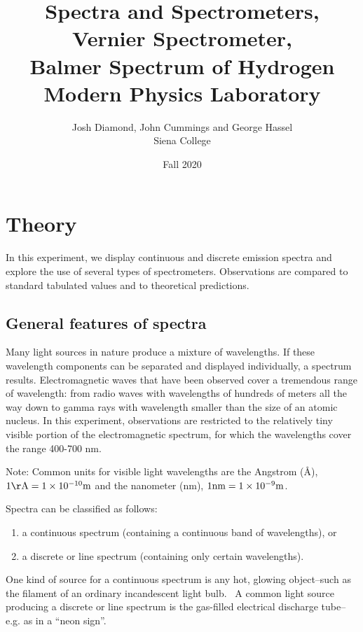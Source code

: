 \documentclass{article}
\begin{document}
\title{Spectra and Spectrometers,\\ Vernier Spectrometer,\\ Balmer Spectrum of Hydrogen\\
Modern Physics Laboratory}
\author{Josh Diamond, John Cummings and George Hassel\\
Siena College}
\date{Fall 2020}
\maketitle

\section{Theory}
In this experiment, we display continuous and discrete emission spectra
and explore the use of several types of spectrometers.  Observations
are compared to standard tabulated values and to theoretical
predictions.


\subsection{General features of spectra}
Many light sources in nature produce a mixture of wavelengths.  If
these wavelength components can be separated and displayed
individually, a spectrum results.  Electromagnetic waves that have
been observed cover a tremendous range of wavelength: from radio waves
with wavelengths of hundreds of meters all the way down to gamma rays
with wavelength smaller than the size of an atomic nucleus. In this
experiment, observations are restricted to the relatively tiny visible
portion of the electromagnetic spectrum, for which the wavelengths
cover the range 400-700 nm.

Note:  Common units for visible light wavelengths are the Angstrom
({\AA}), $1 {\rm \AA} = 1 \times 10^{-10} {\rm m}$ and the nanometer (nm), $1 {\rm nm} = 1 \times 10^{-9} {\rm m}$. 

Spectra can be classified as follows:

\begin{enumerate}
\item a continuous spectrum (containing a continuous band of
wavelengths), or 
\item a discrete or line spectrum (containing only certain wavelengths).
\end{enumerate}

One kind of source for a continuous spectrum is any hot, glowing
object--such as the filament of an ordinary incandescent light bulb.
\ A common light source producing a discrete or line spectrum is the
gas-filled electrical discharge tube--e.g. as in a
``neon sign''.
\end{document}
